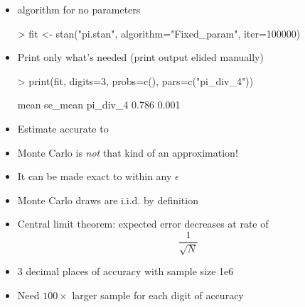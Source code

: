 \documentclass[10pt]{report}
\begin{document}
\begin{itemize}
\item {} algorithm for no parameters
\begin{stancode}
> fit <- stan("pi.stan", algorithm="Fixed_param",
              iter=100000)
\end{stancode}
\item Print only what's needed (print output elided manually)
\begin{stancode}
> print(fit, digits=3, probs=c(), pars=c("pi_div_4"))

          mean se_mean
pi_div_4 0.786   0.001
\end{stancode}
\item Estimate accurate to 
\end{itemize}

%
\begin{itemize}
\item Monte Carlo is \emph{not} that kind of an approximation!
\item It can be made exact to within any $\epsilon$
\item Monte Carlo draws are i.i.d. by definition
\item Central limit theorem: expected error decreases at rate of
{\Large
\[
\frac{1}{\sqrt{N}}
\]
}
\item 3 decimal places of accuracy with
sample size 1e6
\item Need $100 \times$ larger sample for each digit of accuracy
\end{itemize}
\end{document}
